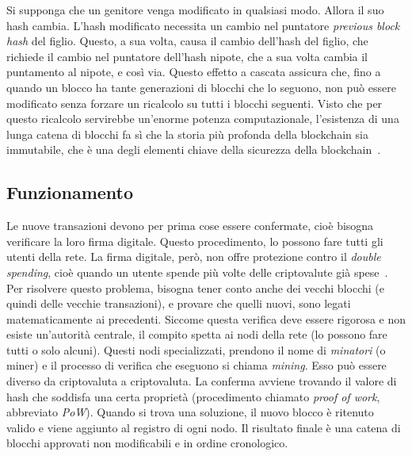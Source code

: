 Si supponga che un genitore venga modificato in qualsiasi modo. Allora il suo hash cambia. L’hash modificato necessita un cambio nel puntatore \textit{previous block hash} del figlio. Questo, a sua volta, causa il cambio dell’hash del figlio, che richiede il cambio nel puntatore dell’hash nipote, che a sua volta cambia il puntamento al nipote, e così via. Questo effetto a cascata assicura che, fino a quando un blocco ha tante generazioni di blocchi che lo seguono, non può essere modificato senza forzare un ricalcolo su tutti i blocchi seguenti. Visto che per questo ricalcolo servirebbe un’enorme potenza computazionale, l’esistenza di una lunga catena di blocchi fa sì che la storia più profonda della blockchain sia immutabile, che \`e una degli elementi chiave della sicurezza della blockchain~\cite{libro:bitcoin}.

\subsection{Funzionamento}
Le nuove transazioni devono per prima cose essere confermate, cio\`e bisogna verificare la loro firma digitale. Questo procedimento, lo possono fare tutti gli utenti della rete. La firma digitale, però, non offre protezione contro il \textit{double spending}, cio\`e quando un utente spende più volte delle criptovalute già spese~\cite{art:satoshi}. Per risolvere questo problema, bisogna tener conto anche dei vecchi blocchi (e quindi delle vecchie transazioni), e provare che quelli nuovi, sono legati matematicamente ai precedenti. Siccome questa verifica deve essere rigorosa e non esiste un'autorità centrale, il compito spetta ai nodi della rete (lo possono fare tutti o solo alcuni). Questi nodi specializzati, prendono il nome di \textit{minatori} (o miner) e il processo di verifica che eseguono si chiama \textit{mining}. Esso può essere diverso da criptovaluta a criptovaluta. La conferma avviene trovando il valore di hash che soddisfa una certa proprietà (procedimento chiamato \textit{proof of work}, abbreviato \textit{PoW}). Quando si trova una soluzione, il nuovo blocco \`e ritenuto valido e viene aggiunto al registro di ogni nodo. Il risultato finale \`e una catena di blocchi approvati non modificabili e in ordine cronologico.

